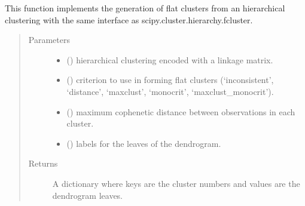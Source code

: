 \documentclass[letterpaper,10pt,english]{sphinxmanual}
\begin{document}
\begin{fulllineitems}
\label{\detokenize{_autosummary/analytics_core.analytics:analytics_core.analytics.wgcnaAnalysis.get_clusters_elements}}
This function implements the generation of flat clusters from an hierarchical clustering with the same interface as scipy.cluster.hierarchy.fcluster.
\begin{quote}\begin{description}
\item[{Parameters}] \leavevmode\begin{itemize}
\item {} 
 () \textendash{} hierarchical clustering encoded with a linkage matrix.

\item {} 
 () \textendash{} criterion to use in forming flat clusters (‘inconsistent’, ‘distance’, ‘maxclust’, ‘monocrit’, ‘maxclust\_monocrit’).

\item {} 
 () \textendash{} maximum cophenetic distance between observations in each cluster.

\item {} 
 () \textendash{} labels for the leaves of the dendrogram.

\end{itemize}

\item[{Returns}] \leavevmode
A dictionary where keys are the cluster numbers and values are the dendrogram leaves.

\end{description}\end{quote}

\end{fulllineitems}
\end{document}
